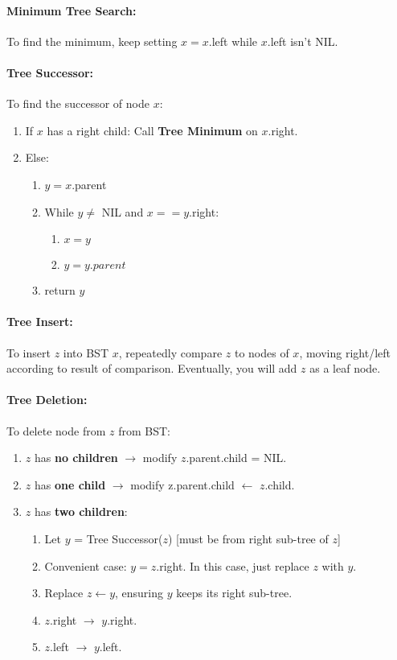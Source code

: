 \documentclass[a4paper,12pt]{report}
\begin{document}
\paragraph{Minimum Tree Search: } To find the minimum, keep setting $x = x$.left while $x$.left isn't NIL.


\paragraph{Tree Successor: } To find the successor of node $x$: 
\begin{enumerate}
\item If $x$ has a right child: Call \textbf{Tree Minimum} on $x$.right.
\item Else: 
\begin{enumerate}
\item $y = x$.parent
\item While $y \neq$ NIL and $x == y$.right:
\begin{enumerate}
\item $x = y$
\item $y = y.parent$
\end{enumerate}
\item return $y$
\end{enumerate}
\end{enumerate}


\paragraph{Tree Insert: } To insert $z$ into BST $x$, repeatedly compare $z$ to nodes of $x$, moving right/left according to result of comparison. Eventually, you will add $z$ as a leaf node. 

\paragraph{Tree Deletion: } To delete node from $z$ from BST: 
\begin{enumerate}
\item $z$ has \textbf{no children} $\to$ modify $z$.parent.child = NIL.
\item $z$ has \textbf{one child} $\to$ modify z.parent.child $\leftarrow$ $z$.child.
\item $z$ has \textbf{two children}:
\begin{enumerate}
\item Let $y$ = Tree Successor($z$) [must be from right sub-tree of $z$]
\item Convenient case: $y = z$.right. In this case, just replace $z$ with $y$.
\item Replace $z \leftarrow y$, ensuring $y$ keeps its right sub-tree.
\item $z$.right $\to$ $y$.right.
\item $z$.left $\to$ $y$.left.
\end{enumerate}
\end{enumerate}
\end{document}
